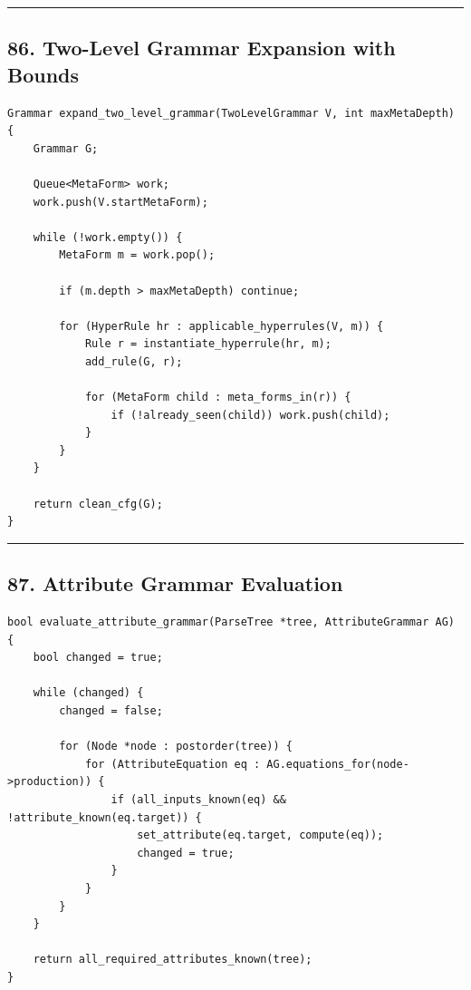 \documentclass[10pt,letterpaper]{article}
\begin{document}
\medskip\hrule\medskip

\subsection*{86. Two-Level Grammar Expansion with Bounds}

\begin{verbatim}
Grammar expand_two_level_grammar(TwoLevelGrammar V, int maxMetaDepth) {
    Grammar G;

    Queue<MetaForm> work;
    work.push(V.startMetaForm);

    while (!work.empty()) {
        MetaForm m = work.pop();

        if (m.depth > maxMetaDepth) continue;

        for (HyperRule hr : applicable_hyperrules(V, m)) {
            Rule r = instantiate_hyperrule(hr, m);
            add_rule(G, r);

            for (MetaForm child : meta_forms_in(r)) {
                if (!already_seen(child)) work.push(child);
            }
        }
    }

    return clean_cfg(G);
}
\end{verbatim}

\medskip\hrule\medskip

\subsection*{87. Attribute Grammar Evaluation}

\begin{verbatim}
bool evaluate_attribute_grammar(ParseTree *tree, AttributeGrammar AG) {
    bool changed = true;

    while (changed) {
        changed = false;

        for (Node *node : postorder(tree)) {
            for (AttributeEquation eq : AG.equations_for(node->production)) {
                if (all_inputs_known(eq) && !attribute_known(eq.target)) {
                    set_attribute(eq.target, compute(eq));
                    changed = true;
                }
            }
        }
    }

    return all_required_attributes_known(tree);
}
\end{verbatim}
\end{document}
